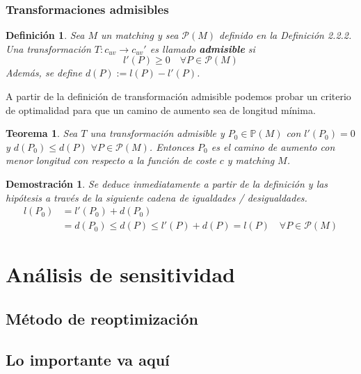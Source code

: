 \documentclass[twoside,a4paper,openright,12pt]{book}
\newtheorem{defi}{Definici\'on}[section]
\newtheorem{thm}{Teorema}[section]
\newtheorem*{dem}{Demostración}
\begin{document}
\subsection{Transformaciones admisibles}
\begin{defi}
Sea $M$ un matching y sea $\mathcal{P}(M)$ definido en la Definición 2.2.2. Una transformación $T:c_{uv}\to c_{uv}'$ es llamado \textbf{admisible} si
$$
l'(P)\geq 0\quad \forall P \in \mathcal{P}(M)
$$
Además, se define $d(P):= l(P)-l'(P)$.
\end{defi}
A partir de la definición de transformación admisible podemos probar un criterio de optimalidad para que un camino de aumento sea de longitud mínima.
\begin{thm}
Sea $T$ una transformación admisible y $P_0 \in \mathbb{P}(M)$ con $l'(P_0) =0$ y 	$d(P_0)\leq d(P)$ $\forall P \in \mathcal{P}(M)$. Entonces $P_0$ es el camino de aumento con menor longitud con respecto a la función de coste $c$ y matching $M$.
\end{thm}
\begin{dem}
Se deduce inmediatamente a partir de la definición y las hipótesis a través de la siguiente cadena de igualdades / desigualdades.
\begin{align*}
l(P_0) &= l'(P_0) + d(P_0)\\
&=d(P_0)\leq d(P) \leq l'(P) + d(P) = l(P)  \quad \forall P \in \mathcal{P}(M)
\end{align*}

\end{dem}
\chapter{Análisis de sensitividad}
\section{Método de reoptimización}
\section{Lo importante va aquí}
\end{document}
